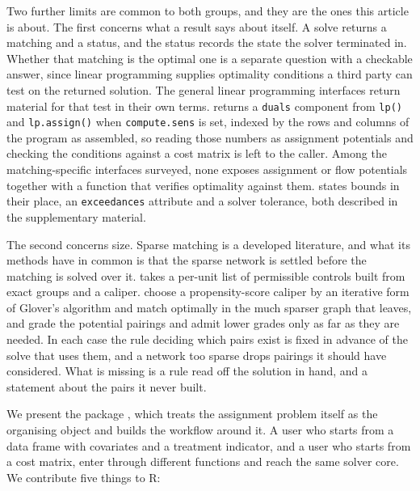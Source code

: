 Two further limits are common to both groups, and they are the ones this
article is about. The first concerns what a result says about itself. A solve
returns a matching and a status, and the status records the state the solver
terminated in. Whether that matching is the optimal one is a separate question with a
checkable answer, since linear programming supplies optimality conditions a
third party can test on the returned solution. The general linear programming
interfaces return material for that test in their own terms.  returns a \texttt{duals} component from \texttt{lp()} and \texttt{lp.assign()} when \texttt{compute.sens}
is set, indexed by the rows and columns of the program as assembled, so reading
those numbers as assignment potentials and checking the conditions against a
cost matrix is left to the caller. Among the matching-specific interfaces
surveyed, none exposes assignment or flow potentials together with a function
that verifies optimality against them.  states bounds in
their place, an \texttt{exceedances} attribute and a solver tolerance, both described
in the supplementary material.

The second concerns size. Sparse matching is a developed literature, and what
its methods have in common is that the sparse network is settled before the
matching is solved over it.  takes a per-unit list of
permissible controls built from exact groups and a caliper. \citet{YuSilberRosenbaum2020} choose a propensity-score caliper by an iterative form
of Glover's algorithm and match optimally in the much sparser graph that
leaves, and \citet{YuRosenbaum2022} grade the potential pairings and admit lower
grades only as far as they are needed. In each case the rule deciding which pairs
exist is fixed in advance of the solve that uses them, and a network too sparse
drops pairings it should have considered. What is missing is a rule read off the
solution in hand, and a statement about the pairs it never built.

We present the  package \citep{couplr}, which treats the assignment
problem itself as the organising object and builds the workflow around it. A
user who starts from a data frame with covariates and a treatment indicator,
and a user who starts from a cost matrix, enter through different functions and
reach the same solver core. We contribute five things to R:

